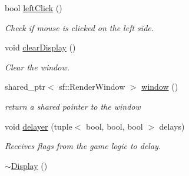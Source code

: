 \begin{DoxyCompactItemize}
bool \mbox{\hyperlink{class_display_a1b81707d811188dbfd98be312679223f}{left\+Click}} ()
\begin{DoxyCompactList}\small\item\em Check if mouse is clicked on the left side. \end{DoxyCompactList}\item 
\mbox{\label{class_display_a9ce27466645f406154c1e48f4cbe5857}} 
void \mbox{\hyperlink{class_display_a9ce27466645f406154c1e48f4cbe5857}{clear\+Display}} ()
\begin{DoxyCompactList}\small\item\em Clear the window. \end{DoxyCompactList}\item 
shared\+\_\+ptr$<$ sf\+::\+Render\+Window $>$ \mbox{\hyperlink{class_display_a5e7a8c62af3817bbd66c7727943bbef9}{window}} ()
\begin{DoxyCompactList}\small\item\em return a shared pointer to the window \end{DoxyCompactList}\item 
void \mbox{\hyperlink{class_display_ab1de6d8b7911336e30999b78f3f6cbe3}{delayer}} (tuple$<$ bool, bool, bool $>$ delays)
\begin{DoxyCompactList}\small\item\em Receives flags from the game logic to delay. \end{DoxyCompactList}\item 
\mbox{\hyperlink{class_display_ac2607a6bb236c55547a4223d40d85d1f}{$\sim$\+Display}} ()
\end{DoxyCompactItemize}
